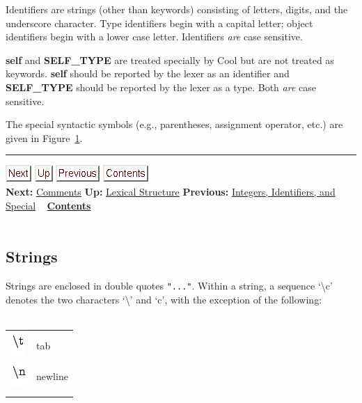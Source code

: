 \documentclass[]{article}
\begin{document}
Identifiers are strings (other than keywords) consisting of letters,
digits, and the underscore character. Type identifiers begin with a
capital letter; object identifiers begin with a lower case letter.
Identifiers \emph{are} case sensitive.

\textbf{self} and \textbf{SELF\_TYPE} are treated specially by Cool but
are not treated as keywords. \textbf{self} should be reported by the
lexer as an identifier and \textbf{SELF\_TYPE} should be reported by the
lexer as a type. Both \emph{are} case sensitive.

The special syntactic symbols (e.g., parentheses, assignment operator,
etc.) are given in Figure~\href{node39.html\#fig1}{1}.

\begin{center}\rule{3in}{0.4pt}\end{center}

\href{node36.html}{\includegraphics{next.png}}
\href{node33.html}{\includegraphics{up.png}}
\href{node34.html}{\includegraphics{prev.png}}
\href{node1.html}{\includegraphics{contents.png}} \\ \textbf{Next:}
\href{node36.html}{Comments} \textbf{Up:} \href{node33.html}{Lexical
Structure} \textbf{Previous:} \href{node34.html}{Integers, Identifiers,
and Special} ~ \textbf{\href{node1.html}{Contents}} \\ \\

\subsection{Strings}

Strings are enclosed in double quotes \texttt{"..."}. Within a string, a
sequence `\textbackslash{}c' denotes the two characters
`\textbackslash{}' and `c', with the exception of the following: \\ \\

\begin{longtable}[c]{@{}ll@{}}
\hline\noalign{\medskip}
\includegraphics{img33.png} & tab
\\\noalign{\medskip}
\includegraphics{img34.png} & newline
\\\noalign{\medskip}
\hline
\end{longtable}
\end{document}
